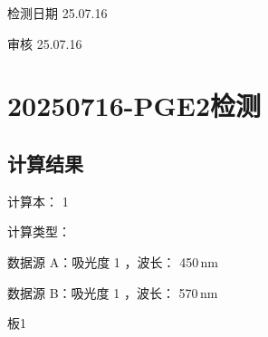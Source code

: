 \documentclass[UTF8,10pt,a4paper,fontset=fandol]{ctexart}
\newcommand{\fieldvalue}[1]{#1}
\newcommand{\handwritten}[1]{#1}
\begin{document}
\handwritten{检测日期 25.07.16}

\handwritten{审核 25.07.16}

\newpage

\section*{20250716-PGE2检测}

\subsection*{计算结果}

计算本：%
\fieldvalue{1}

计算类型：%

数据源 A：吸光度%
\fieldvalue{1}
，波长：%
\fieldvalue{450\,nm}

数据源 B：吸光度%
\fieldvalue{1}
，波长：%
\fieldvalue{570\,nm}

板1
\end{document}
